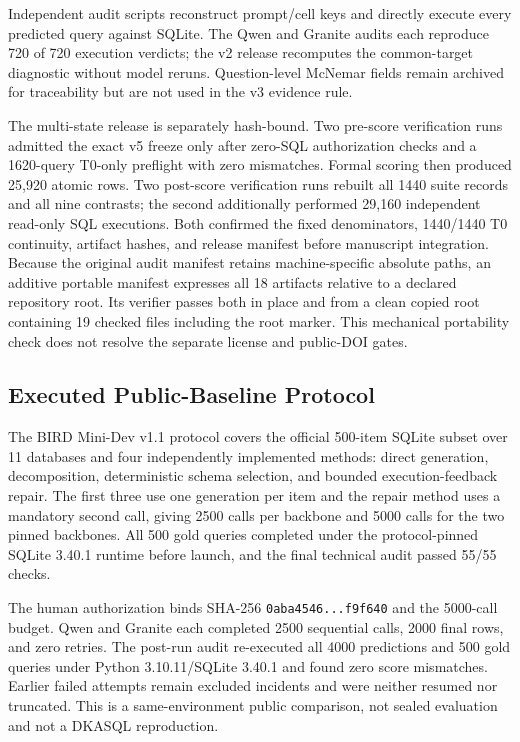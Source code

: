 \documentclass[applsci,article,submit,moreauthors]{Definitions/mdpi}
\begin{document}
Independent audit scripts reconstruct prompt/cell keys and directly execute every predicted query against SQLite. The Qwen and Granite audits each reproduce 720 of 720 execution verdicts; the v2 release recomputes the common-target diagnostic without model reruns. Question-level McNemar fields remain archived for traceability but are not used in the v3 evidence rule.

The multi-state release is separately hash-bound. Two pre-score verification runs admitted the exact v5 freeze only after zero-SQL authorization checks and a 1620-query T0-only preflight with zero mismatches. Formal scoring then produced 25,920 atomic rows. Two post-score verification runs rebuilt all 1440 suite records and all nine contrasts; the second additionally performed 29,160 independent read-only SQL executions. Both confirmed the fixed denominators, 1440/1440 T0 continuity, artifact hashes, and release manifest before manuscript integration. Because the original audit manifest retains machine-specific absolute paths, an additive portable manifest expresses all 18 artifacts relative to a declared repository root. Its verifier passes both in place and from a clean copied root containing 19 checked files including the root marker. This mechanical portability check does not resolve the separate license and public-DOI gates.

\subsection{Executed Public-Baseline Protocol}
The BIRD Mini-Dev v1.1 protocol covers the official 500-item SQLite subset over 11 databases and four independently implemented methods: direct generation, decomposition, deterministic schema selection, and bounded execution-feedback repair. The first three use one generation per item and the repair method uses a mandatory second call, giving 2500 calls per backbone and 5000 calls for the two pinned backbones. All 500 gold queries completed under the protocol-pinned SQLite 3.40.1 runtime before launch, and the final technical audit passed 55/55 checks.

The human authorization binds SHA-256 \texttt{0aba4546...f9f640} and the 5000-call budget. Qwen and Granite each completed 2500 sequential calls, 2000 final rows, and zero retries. The post-run audit re-executed all 4000 predictions and 500 gold queries under Python 3.10.11/SQLite 3.40.1 and found zero score mismatches. Earlier failed attempts remain excluded incidents and were neither resumed nor truncated. This is a same-environment public comparison, not sealed evaluation and not a DKASQL reproduction.
\end{document}
